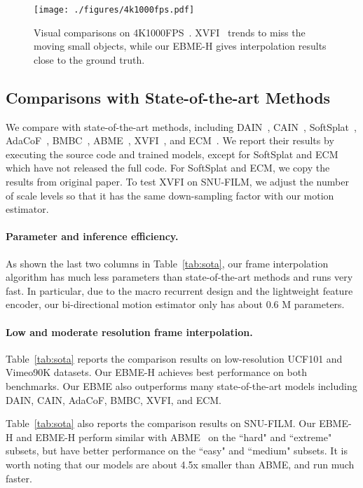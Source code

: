 \documentclass[10pt,twocolumn,letterpaper]{article}
\begin{document}
\begin{figure*}[tb]
\centering
\texttt{[image: ./figures/4k1000fps.pdf]}
\caption{Visual comparisons on 4K1000FPS~\cite{sim2021xvfi}.
XVFI~\cite{sim2021xvfi} trends to miss the moving small objects, while our
EBME-H gives interpolation results close to the ground truth.}
\label{fig:4k1000fps}
\end{figure*}



\subsection{Comparisons with State-of-the-art Methods}

We compare with state-of-the-art methods, including DAIN~\cite{bao2019depth},
CAIN~\cite{choi2020channel}, SoftSplat~\cite{niklaus2020softmax},
AdaCoF~\cite{lee2020adacof}, BMBC~\cite{park2020bmbc},
ABME~\cite{park2021asymmetric},  XVFI~\cite{sim2021xvfi}, and
ECM~\cite{lee2022enhanced}. We report their results by executing the source code
and trained models, except for SoftSplat and ECM which have not released the
full code. For SoftSplat and ECM, we copy the results from original paper.
To test XVFI on SNU-FILM, we adjust the number of scale levels so that it
has the same down-sampling factor with our motion estimator.



\paragraph{Parameter and inference efficiency.} As shown the last two columns in
Table~\ref{tab:sota}, our frame interpolation algorithm has much less parameters
than state-of-the-art methods and runs very fast. In particular, due to the
macro recurrent design and the lightweight feature encoder, our bi-directional
motion estimator only has about 0.6 M parameters.



\paragraph{Low and moderate resolution frame interpolation.}
Table~\ref{tab:sota} reports the comparison results on low-resolution UCF101 and
Vimeo90K datasets. Our EBME-H achieves best performance on both benchmarks.
Our EBME also outperforms many state-of-the-art models including DAIN, CAIN,
AdaCoF, BMBC, XVFI, and ECM.


Table~\ref{tab:sota} also reports the comparison results on SNU-FILM. Our EBME-H
and EBME-H perform similar with ABME~\cite{park2021asymmetric} on the
``hard" and ``extreme" subsets, but have better performance on the ``easy" and
``medium" subsets. It is worth noting that our models are about 4.5x smaller
than ABME, and run much faster.
\end{document}
